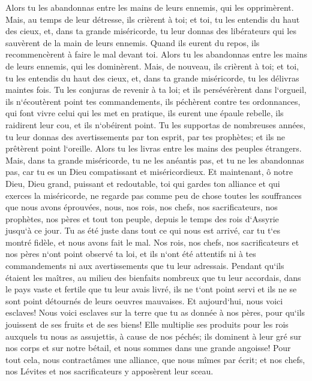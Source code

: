 \verse Alors tu les abandonnas entre les mains de leurs ennemis, qui les opprimèrent. Mais, au temps de leur détresse, ils crièrent à toi; et toi, tu les entendis du haut des cieux, et, dans ta grande miséricorde, tu leur donnas des libérateurs qui les sauvèrent de la main de leurs ennemis. 
\verse Quand ils eurent du repos, ils recommencèrent à faire le mal devant toi. Alors tu les abandonnas entre les mains de leurs ennemis, qui les dominèrent. Mais, de nouveau, ils crièrent à toi; et toi, tu les entendis du haut des cieux, et, dans ta grande miséricorde, tu les délivras maintes fois. 
\verse Tu les conjuras de revenir à ta loi; et ils persévérèrent dans l`orgueil, ils n`écoutèrent point tes commandements, ils péchèrent contre tes ordonnances, qui font vivre celui qui les met en pratique, ils eurent une épaule rebelle, ils raidirent leur cou, et ils n`obéirent point. 
\verse Tu les supportas de nombreuses années, tu leur donnas des avertissements par ton esprit, par tes prophètes; et ils ne prêtèrent point l`oreille. Alors tu les livras entre les mains des peuples étrangers. 
\verse Mais, dans ta grande miséricorde, tu ne les anéantis pas, et tu ne les abandonnas pas, car tu es un Dieu compatissant et miséricordieux. 
\verse Et maintenant, ô notre Dieu, Dieu grand, puissant et redoutable, toi qui gardes ton alliance et qui exerces la miséricorde, ne regarde pas comme peu de chose toutes les souffrances que nous avons éprouvées, nous, nos rois, nos chefs, nos sacrificateurs, nos prophètes, nos pères et tout ton peuple, depuis le temps des rois d`Assyrie jusqu`à ce jour. 
\verse Tu as été juste dans tout ce qui nous est arrivé, car tu t`es montré fidèle, et nous avons fait le mal. 
\verse Nos rois, nos chefs, nos sacrificateurs et nos pères n`ont point observé ta loi, et ils n`ont été attentifs ni à tes commandements ni aux avertissements que tu leur adressais. 
\verse Pendant qu`ils étaient les maîtres, au milieu des bienfaits nombreux que tu leur accordais, dans le pays vaste et fertile que tu leur avais livré, ils ne t`ont point servi et ils ne se sont point détournés de leurs oeuvres mauvaises. 
\verse Et aujourd`hui, nous voici esclaves! Nous voici esclaves sur la terre que tu as donnée à nos pères, pour qu`ils jouissent de ses fruits et de ses biens! 
\verse Elle multiplie ses produits pour les rois auxquels tu nous as assujettis, à cause de nos péchés; ils dominent à leur gré sur nos corps et sur notre bétail, et nous sommes dans une grande angoisse! 
\verse Pour tout cela, nous contractâmes une alliance, que nous mîmes par écrit; et nos chefs, nos Lévites et nos sacrificateurs y apposèrent leur sceau. 

